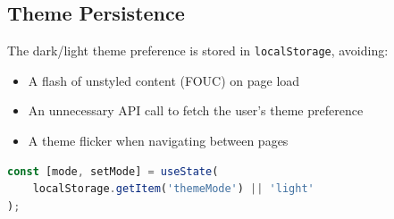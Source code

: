 \subsection{Theme Persistence}

The dark/light theme preference is stored in \texttt{localStorage}, avoiding:
\begin{itemize}
    \item A flash of unstyled content (FOUC) on page load
    \item An unnecessary API call to fetch the user's theme preference
    \item A theme flicker when navigating between pages
\end{itemize}

\begin{lstlisting}[language=javascript, caption=Local Storage Theme Persistence]
const [mode, setMode] = useState(
    localStorage.getItem('themeMode') || 'light'
);
\end{lstlisting}


